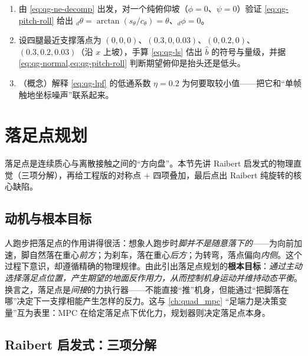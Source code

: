 \begin{practice}
\begin{enumerate}
  \item 由 \cref{eq:qg-ne-decomp} 出发，对一个纯俯仰坡（$\phi=0$、$\psi=0$）验证 \cref{eq:qg-pitch-roll} 给出 ${}_d\theta=\arctan(s_\theta/c_\theta)=\theta$、${}_d\phi=0$。
  \item 设四腿最近支撑落点为 $(0,0,0)$、$(0.3,0,0.03)$、$(0,0.2,0)$、$(0.3,0.2,0.03)$（沿 $x$ 上坡），手算 \cref{eq:qg-ls} 估出 $\hat b$ 的符号与量级，并据 \cref{eq:qg-normal,eq:qg-pitch-roll} 判断期望俯仰是抬头还是低头。
  \item （概念）解释 \cref{eq:qg-lpf} 的低通系数 $\eta=0.2$ 为何要取较小值——把它和“单帧触地坐标噪声”联系起来。
\end{enumerate}
\end{practice}

\section{落足点规划}
\label{sec:qg-footstep}

落足点是连续质心与离散接触之间的“方向盘”。本节先讲 Raibert 启发式的物理直觉（三项分解），再给工程版的对称点 $+$ 四项叠加，最后点出 Raibert 纯旋转的核心缺陷。

\subsection{动机与根本目标}
\label{subsec:qg-foot-motivation}

\begin{insight}[落足点的人类跑步类比]\label{ins:qg-running}
人跑步把落足点的作用讲得很活：想象人跑步时\emph{脚并不是随意落下的}——为向前加速，脚自然落在重心\emph{前方}；为刹车，落在重心\emph{后方}；为转弯，落点偏向\emph{内侧}\cite{unitree2023quadruped}。这个过程下意识，却遵循精确的物理规律。由此引出落足点规划的\textbf{根本目标}：\emph{通过主动选择落足点位置，产生期望的地面反作用力，从而控制机身运动并维持动态平衡}。换言之，落足点是\emph{间接}的力执行器——不能直接“推”机身，但能通过“把脚落在哪”决定下一支撑相能产生怎样的反力。这与 \cref{ch:quad_mpc} “足端力是决策变量”互为表里：MPC 在给定落足点下优化力，规划器则决定落足点本身。
\end{insight}

\subsection{Raibert 启发式：三项分解}
\label{subsec:qg-raibert}

